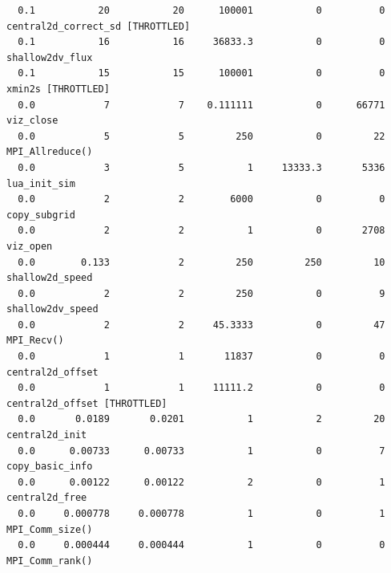 \documentclass{article}
\begin{document}
{\begin{verbatim}
  0.1           20           20      100001           0          0 central2d_correct_sd [THROTTLED]
  0.1           16           16     36833.3           0          0 shallow2dv_flux 
  0.1           15           15      100001           0          0 xmin2s [THROTTLED]
  0.0            7            7    0.111111           0      66771 viz_close 
  0.0            5            5         250           0         22 MPI_Allreduce() 
  0.0            3            5           1     13333.3       5336 lua_init_sim 
  0.0            2            2        6000           0          0 copy_subgrid 
  0.0            2            2           1           0       2708 viz_open 
  0.0        0.133            2         250         250         10 shallow2d_speed 
  0.0            2            2         250           0          9 shallow2dv_speed 
  0.0            2            2     45.3333           0         47 MPI_Recv() 
  0.0            1            1       11837           0          0 central2d_offset 
  0.0            1            1     11111.2           0          0 central2d_offset [THROTTLED]
  0.0       0.0189       0.0201           1           2         20 central2d_init 
  0.0      0.00733      0.00733           1           0          7 copy_basic_info 
  0.0      0.00122      0.00122           2           0          1 central2d_free 
  0.0     0.000778     0.000778           1           0          1 MPI_Comm_size() 
  0.0     0.000444     0.000444           1           0          0 MPI_Comm_rank() 
\end{verbatim}
}
\end{document}
